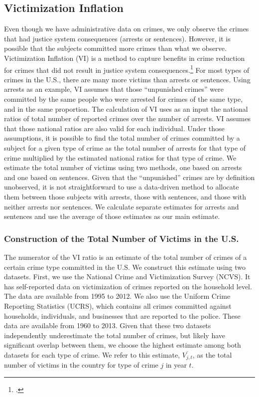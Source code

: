 \subsection{Victimization Inflation}
\label{appendix:crime-VI}
\noindent Even though we have administrative data on crimes, we only observe the crimes that had justice system consequences (arrests or sentences). However, it is possible that the subjects committed more crimes than what we observe. Victimization Inflation (VI) is a method to capture benefits in crime reduction for crimes that did not result in justice system consequences.\footnote{\citet{Belfield_Nores_etal_2006_JHR,Heckman_Moon_etal_2010_RateofReturn}.} For most types of crimes in the U.S., there are many more victims than arrests or sentences. Using arrests as an example, VI assumes that those ``unpunished crimes'' were committed by the same people who were arrested for crimes of the same type, and in the same proportion. The calculation of VI uses as an input the national ratios of total number of reported crimes over the number of arrests. VI assumes that those national ratios are also valid for each individual. Under those assumptions, it is possible to find the total number of crimes committed by a subject for a given type of crime as the total number of arrests for that type of crime multiplied by the estimated national ratios for that type of crime. We estimate the total number of victims using two methods, one based on arrests and one based on sentences. Given that the ``unpunished'' crimes are by definition unobserved, it is not straightforward to use a data-driven method to allocate them between those subjects with arrests, those with sentences, and those with neither arrests nor sentences. We calculate separate estimates for arrests and sentences and use the average of those estimates as our main estimate. 

\subsubsection{Construction of the Total Number of Victims in the U.S.}

\noindent The numerator of the VI ratio is an estimate of the total number of crimes of a certain crime type committed in the U.S. We construct this estimate using two datasets. First, we use the National Crime and Victimization Survey (NCVS). It has self-reported data on victimization of crimes reported on the household level. The data are available from 1995 to 2012. We also use the Uniform Crime Reporting Statistics (UCRS), which contains all crimes committed against households, individuals, and businesses that are reported to the police. These data are available from 1960 to 2013. Given that these two datasets independently underestimate the total number of crimes, but likely have significant overlap between them, we choose the highest estimate among both datasets for each type of crime. We refer to this estimate, $\overline{V_{j,t}}$, as the total number of victims in the country for type of crime $j$ in year $t$. 

